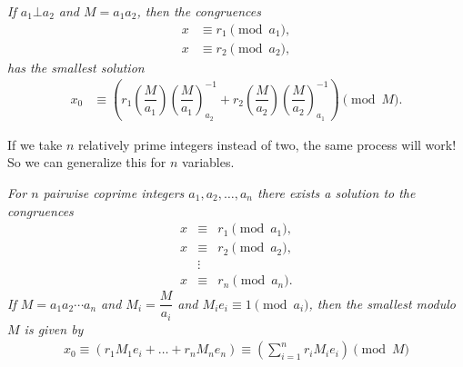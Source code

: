 \documentclass{subfile}
\begin{document}
		\begin{theorem}\slshape
			If $a_1\bot a_2$ and $M=a_1a_2$, then the congruences	
			\begin{align*}
			x & \equiv r_1\pmod{a_1},\\
			x & \equiv r_2\pmod{a_2},
			\end{align*}
			has the smallest solution
			\begin{align*}
			x_0 & \equiv 
			\left(r_1\left(\dfrac{M}{a_1}\right)\left(\dfrac{M}{a_1}\right)^{-1}_{a_2}+r_2\left(\dfrac{M}{a_2}\right)\left(\dfrac{M}{a_2}\right)^{-1}_{a_1}\right)\pmod{M}.
			\end{align*}
		\end{theorem}
	If we take $n$ relatively prime integers instead of two, the same process will work! So we can generalize this for $n$ variables.
		\begin{theorem}[CRT]\slshape
			For $n$ pairwise coprime integers $a_1,a_2,\ldots,a_n$ there exists a solution to the congruences
			\begin{eqnarray*}
			x & \equiv& r_1\pmod{a_1},\\
			x & \equiv& r_2\pmod{a_2},\\
			   &\vdots&\\
			x & \equiv& r_n\pmod{a_n}.
			\end{eqnarray*}
			If $M=a_1a_2\cdots a_n$ and $M_i=\dfrac{M}{a_i}$ and $M_ie_i\equiv1\pmod{a_i}$, then the smallest  modulo $M$ is given by
			\begin{align*}
			x_0  \equiv \left(r_1 M_1e_i+\ldots+r_n M_ne_n\right)\equiv \left(\sum_{i=1}^{n} r_i M_ie_i\right)\pmod M
			\end{align*}
		\end{theorem}
	
\end{document}
